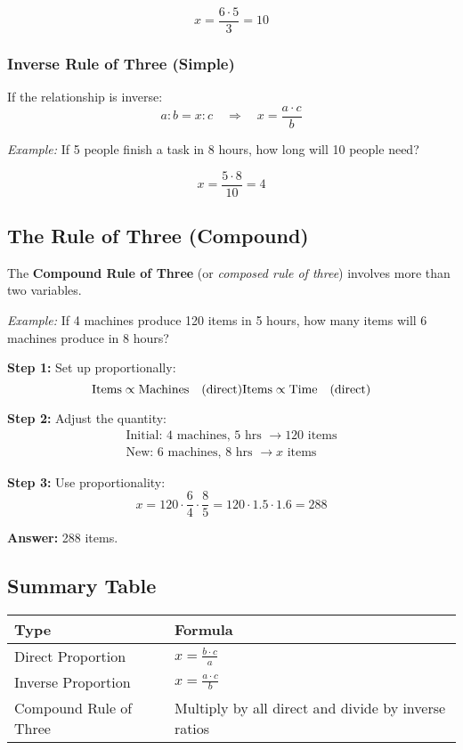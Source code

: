 \[
x = \frac{6 \cdot 5}{3} = 10
\]

\subsubsection*{Inverse Rule of Three (Simple)}

If the relationship is inverse:
\[
a : b = x : c \quad \Rightarrow \quad x = \frac{a \cdot c}{b}
\]

\textit{Example:} If 5 people finish a task in 8 hours, how long will 10 people need?

\[
x = \frac{5 \cdot 8}{10} = 4
\]

\subsection{The Rule of Three (Compound)}

The \textbf{Compound Rule of Three} (or \textit{composed rule of three}) involves more than two variables.

\textit{Example:} If 4 machines produce 120 items in 5 hours, how many items will 6 machines produce in 8 hours?

\textbf{Step 1:} Set up proportionally:
\[
\text{Items} \propto \text{Machines} \quad (\text{direct}) \\
\text{Items} \propto \text{Time} \quad (\text{direct})
\]

\textbf{Step 2:} Adjust the quantity:
\begin{align*}
\text{Initial: } 4 \text{ machines, } 5 \text{ hrs } \rightarrow 120 \text{ items} \\
\text{New: } 6 \text{ machines, } 8 \text{ hrs } \rightarrow x \text{ items}
\end{align*}

\textbf{Step 3:} Use proportionality:
\[
x = 120 \cdot \frac{6}{4} \cdot \frac{8}{5} = 120 \cdot 1.5 \cdot 1.6 = 288
\]

\textbf{Answer:} 288 items.

\subsection*{Summary Table}

\begin{center}
\begin{tabular}{|l|l|}
\hline
\textbf{Type} & \textbf{Formula} \\
\hline
Direct Proportion & $x = \frac{b \cdot c}{a}$ \\
Inverse Proportion & $x = \frac{a \cdot c}{b}$ \\
Compound Rule of Three & Multiply by all direct and divide by inverse ratios \\
\hline
\end{tabular}
\end{center}
\newpage
